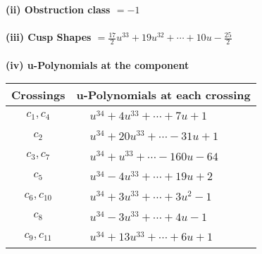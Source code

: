 \documentclass[1p]{elsarticle_modified}
\theoremstyle{definition}
\begin{document}
\flushleft \textbf{(ii) Obstruction class $= -1$}\\~\\
\flushleft \textbf{(iii) Cusp Shapes $= \frac{17}{2} u^{33}+19 u^{32}+\cdots+10 u-\frac{25}{2}$}\\~\\
\newpage\renewcommand{\arraystretch}{1}
\flushleft \textbf{(iv) u-Polynomials at the component}\newline \\
\begin{tabular}{m{50pt}|m{274pt}}
Crossings & \hspace{64pt}u-Polynomials at each crossing \\
\hline $$\begin{aligned}c_{1},c_{4}\end{aligned}$$&$\begin{aligned}
&u^{34}+4 u^{33}+\cdots+7 u+1
\end{aligned}$\\
\hline $$\begin{aligned}c_{2}\end{aligned}$$&$\begin{aligned}
&u^{34}+20 u^{33}+\cdots-31 u+1
\end{aligned}$\\
\hline $$\begin{aligned}c_{3},c_{7}\end{aligned}$$&$\begin{aligned}
&u^{34}+u^{33}+\cdots-160 u-64
\end{aligned}$\\
\hline $$\begin{aligned}c_{5}\end{aligned}$$&$\begin{aligned}
&u^{34}-4 u^{33}+\cdots+19 u+2
\end{aligned}$\\
\hline $$\begin{aligned}c_{6},c_{10}\end{aligned}$$&$\begin{aligned}
&u^{34}+3 u^{33}+\cdots+3 u^2-1
\end{aligned}$\\
\hline $$\begin{aligned}c_{8}\end{aligned}$$&$\begin{aligned}
&u^{34}-3 u^{33}+\cdots+4 u-1
\end{aligned}$\\
\hline $$\begin{aligned}c_{9},c_{11}\end{aligned}$$&$\begin{aligned}
&u^{34}+13 u^{33}+\cdots+6 u+1
\end{aligned}$\\
\hline
\end{tabular}\\~\\
\end{document}
